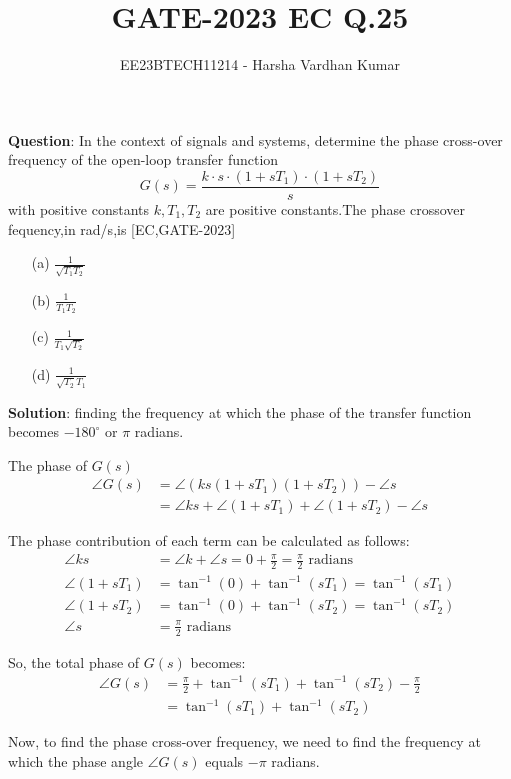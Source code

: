\documentclass[journal,12pt,twocolumn]{IEEEtran}
\title{GATE-2023 EC Q.25}
\author{EE23BTECH11214 - Harsha Vardhan Kumar}
\begin{document}
\maketitle

\textbf{Question}:
In the context of signals and systems, determine the phase cross-over frequency of the open-loop transfer function
\[
G(s) = \frac{k \cdot s \cdot (1+sT_1) \cdot (1+sT_2)}{s}
\]
with positive constants $k, T_1, T_2$ are positive constants.The phase crossover fequency,in rad/s,is
\hfill [EC,GATE-$2023$]
\begin{enumerate}
  \item[(a)] $\frac{1}{\sqrt{T_1 T_2}}$
  \item[(b)] $\frac{1}{T_1 T_2}$
  \item[(c)] $\frac{1}{T_1\sqrt{T_2}}$
  \item[(d)] $\frac{1}{\sqrt{T_2}T_1}$
\end{enumerate}
\textbf{Solution}:
finding the frequency at which the phase of the transfer function becomes \( -180^\circ \) or \( \pi \) radians.

The phase of \( G(s) \)
\begin{align}
\angle G(s) &= \angle (ks(1+sT_1)(1+sT_2)) - \angle s \\
&= \angle ks + \angle (1+sT_1) + \angle (1+sT_2) - \angle s \nonumber
\end{align}

The phase contribution of each term can be calculated as follows:
\begin{align}
\angle ks &= \angle k + \angle s = 0 + \frac{\pi}{2} = \frac{\pi}{2} \text{ radians} \\
\angle (1+sT_1) &= \tan^{-1}(0) + \tan^{-1}(sT_1) = \tan^{-1}(sT_1) \nonumber \\
\angle (1+sT_2) &= \tan^{-1}(0) + \tan^{-1}(sT_2) = \tan^{-1}(sT_2) \nonumber \\
\angle s &= \frac{\pi}{2} \text{ radians} \nonumber
\end{align}

So, the total phase of \( G(s) \) becomes:
\begin{align}
\angle G(s) &= \frac{\pi}{2} + \tan^{-1}(sT_1) + \tan^{-1}(sT_2) - \frac{\pi}{2} \nonumber \\
&= \tan^{-1}(sT_1) + \tan^{-1}(sT_2)
\end{align}

Now, to find the phase cross-over frequency, we need to find the frequency at which the phase angle \( \angle G(s) \) equals \( -\pi \) radians.
\end{document}

